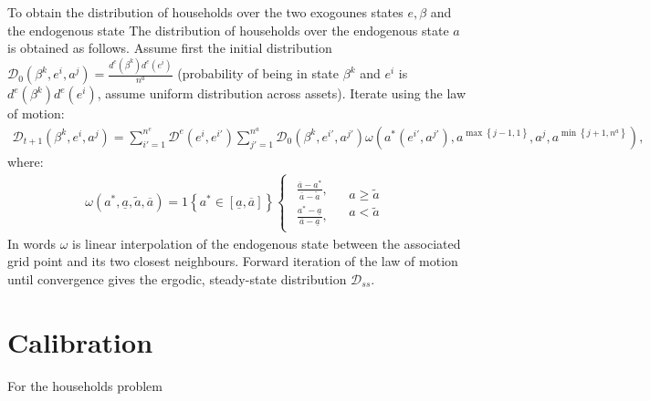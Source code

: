 To obtain the distribution of households over the two exogounes states $e,\beta$ and the endogenous state 
The distribution of households over the endogenous state $a$ is obtained as follows. Assume first the initial distribution $\mathcal{D}_{0}\left(\beta^{k},e^{i},a^{j}\right)=\frac{d^{e}\left(\beta^{k}\right)d^{e}\left(e^{i}\right)}{n^{a}}$ (probability of being in state $\beta^{k}$ and $e^{i}$ is $d^{e}\left(\beta^{k}\right)d^{e}\left(e^{i}\right)$, assume uniform distribution across assets). Iterate using the law of motion:
\begin{gather*}
\mathcal{D}_{t+1}\left(\beta^{k},e^{i},a^{j}\right)=\sum_{i'=1}^{n^{e}}\mathcal{D}^{e}\left(e^{i},e^{i'}\right)\sum_{j'=1}^{n^{a}}\mathcal{D}_{0}\left(\beta^{k},e^{i'},a^{j'}\right)\omega\left(a^{*}\left(e^{i'},a^{j'}\right),a^{\max\left\{ j-1,1\right\} },a^{j},a^{\min\left\{ j+1,n^{a}\right\} }\right),    
\end{gather*}
where:
\begin{gather*}
\omega\left(a^{*},\underline{a},\tilde{a},\overline{a}\right)=1\left\{ a^{*}\in\left[\underline{a},\overline{a}\right]\right\} \begin{cases}
\begin{array}{c}
\frac{\overline{a}-a^{*}}{\overline{a}-\tilde{a}},\\
\frac{a^{*}-\underline{a}}{\overline{a}-\underline{a}},
\end{array} & \begin{array}{c}
a\geq\tilde{a}\\
a<\tilde{a}
\end{array}\end{cases}
\end{gather*}
In words $\omega$ is linear interpolation of the endogenous state between the associated grid point and its two closest neighbours. Forward iteration of the law of motion until convergence gives the ergodic, steady-state distribution $\mathcal{D}_{ss}$. 
 
 
\section{Calibration}


For the households problem 




